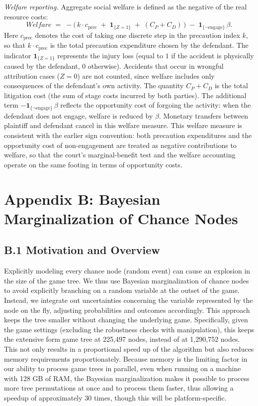 \documentclass{article}
\begin{document}
\emph{Welfare reporting.} Aggregate social welfare is defined as the negative of the real resource costs:
\[
Welfare \;=\; -\bigl(\,k \cdot c_{\mathrm{prec}} \;+\; \mathbf{1}_{\{Z=1\}} \;+\; (C_P+C_D)\,\bigr)
\;-\;\mathbf{1}_{\{\neg \text{engage}\}}\,\beta.
\]
Here $c_{\mathrm{prec}}$ denotes the cost of taking one discrete step in the precaution index $k$, so that $k \cdot c_{\mathrm{prec}}$ is the total precaution expenditure chosen by the defendant. The indicator $\mathbf{1}_{\{Z=1\}}$ represents the injury loss (equal to $1$ if the accident is physically caused by the defendant, $0$ otherwise). Accidents that occur in wrongful attribution cases ($Z=0$) are not counted, since welfare includes only consequences of the defendant’s own activity. The quantity $C_P+C_D$ is the total litigation cost (the sum of stage costs incurred by both parties). The additional term $-\mathbf{1}_{\{\neg \text{engage}\}}\,\beta$ reflects the opportunity cost of forgoing the activity: when the defendant does not engage, welfare is reduced by $\beta$. Monetary transfers between plaintiff and defendant cancel in this welfare measure. This welfare measure is consistent with the earlier sign convention: both precaution expenditures and the opportunity cost of non-engagement are treated as negative contributions to welfare, so that the court’s marginal-benefit test and the welfare accounting operate on the same footing in terms of opportunity costs.

\section*{Appendix B: Bayesian Marginalization of Chance Nodes}

\subsection*{B.1 Motivation and Overview}

Explicitly modeling every chance node (random event) can cause an explosion in the size of the game tree. We thus use Bayesian marginalization of chance nodes to avoid explicitly branching on a random variable at the outset of the game. Instead, we integrate out uncertainties concerning the variable represented by the node on the fly, adjusting probabilities and outcomes accordingly. This approach keeps the tree smaller without changing the underlying game. Specifically, given the game settings (excluding the robustness checks with manipulation), this keeps the extensive form game tree at 225,497 nodes, instead of at 1,290,752 nodes. This not only results in a proportional speed up of the algorithm but also reduces memory requirements proportionately. Because memory is the limiting factor in our ability to process game trees in parallel, even when running on a machine with 128 GB of RAM, the Bayesian marginalization makes it possible to process more tree permutations at once and to process them faster, thus allowing a speedup of approximately 30 times, though this will be platform-specific.
\end{document}
